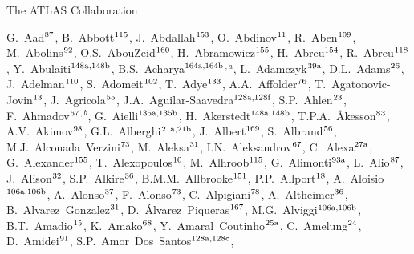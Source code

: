\begin{flushleft}
{\Large The ATLAS Collaboration}

\bigskip

G.~Aad$^\textrm{\scriptsize 87}$,
B.~Abbott$^\textrm{\scriptsize 115}$,
J.~Abdallah$^\textrm{\scriptsize 153}$,
O.~Abdinov$^\textrm{\scriptsize 11}$,
R.~Aben$^\textrm{\scriptsize 109}$,
M.~Abolins$^\textrm{\scriptsize 92}$,
O.S.~AbouZeid$^\textrm{\scriptsize 160}$,
H.~Abramowicz$^\textrm{\scriptsize 155}$,
H.~Abreu$^\textrm{\scriptsize 154}$,
R.~Abreu$^\textrm{\scriptsize 118}$,
Y.~Abulaiti$^\textrm{\scriptsize 148a,148b}$,
B.S.~Acharya$^\textrm{\scriptsize 164a,164b}$$^{,a}$,
L.~Adamczyk$^\textrm{\scriptsize 39a}$,
D.L.~Adams$^\textrm{\scriptsize 26}$,
J.~Adelman$^\textrm{\scriptsize 110}$,
S.~Adomeit$^\textrm{\scriptsize 102}$,
T.~Adye$^\textrm{\scriptsize 133}$,
A.A.~Affolder$^\textrm{\scriptsize 76}$,
T.~Agatonovic-Jovin$^\textrm{\scriptsize 13}$,
J.~Agricola$^\textrm{\scriptsize 55}$,
J.A.~Aguilar-Saavedra$^\textrm{\scriptsize 128a,128f}$,
S.P.~Ahlen$^\textrm{\scriptsize 23}$,
F.~Ahmadov$^\textrm{\scriptsize 67}$$^{,b}$,
G.~Aielli$^\textrm{\scriptsize 135a,135b}$,
H.~Akerstedt$^\textrm{\scriptsize 148a,148b}$,
T.P.A.~{\AA}kesson$^\textrm{\scriptsize 83}$,
A.V.~Akimov$^\textrm{\scriptsize 98}$,
G.L.~Alberghi$^\textrm{\scriptsize 21a,21b}$,
J.~Albert$^\textrm{\scriptsize 169}$,
S.~Albrand$^\textrm{\scriptsize 56}$,
M.J.~Alconada~Verzini$^\textrm{\scriptsize 73}$,
M.~Aleksa$^\textrm{\scriptsize 31}$,
I.N.~Aleksandrov$^\textrm{\scriptsize 67}$,
C.~Alexa$^\textrm{\scriptsize 27a}$,
G.~Alexander$^\textrm{\scriptsize 155}$,
T.~Alexopoulos$^\textrm{\scriptsize 10}$,
M.~Alhroob$^\textrm{\scriptsize 115}$,
G.~Alimonti$^\textrm{\scriptsize 93a}$,
L.~Alio$^\textrm{\scriptsize 87}$,
J.~Alison$^\textrm{\scriptsize 32}$,
S.P.~Alkire$^\textrm{\scriptsize 36}$,
B.M.M.~Allbrooke$^\textrm{\scriptsize 151}$,
P.P.~Allport$^\textrm{\scriptsize 18}$,
A.~Aloisio$^\textrm{\scriptsize 106a,106b}$,
A.~Alonso$^\textrm{\scriptsize 37}$,
F.~Alonso$^\textrm{\scriptsize 73}$,
C.~Alpigiani$^\textrm{\scriptsize 78}$,
A.~Altheimer$^\textrm{\scriptsize 36}$,
B.~Alvarez~Gonzalez$^\textrm{\scriptsize 31}$,
D.~\'{A}lvarez~Piqueras$^\textrm{\scriptsize 167}$,
M.G.~Alviggi$^\textrm{\scriptsize 106a,106b}$,
B.T.~Amadio$^\textrm{\scriptsize 15}$,
K.~Amako$^\textrm{\scriptsize 68}$,
Y.~Amaral~Coutinho$^\textrm{\scriptsize 25a}$,
C.~Amelung$^\textrm{\scriptsize 24}$,
D.~Amidei$^\textrm{\scriptsize 91}$,
S.P.~Amor~Dos~Santos$^\textrm{\scriptsize 128a,128c}$,

\end{flushleft}
